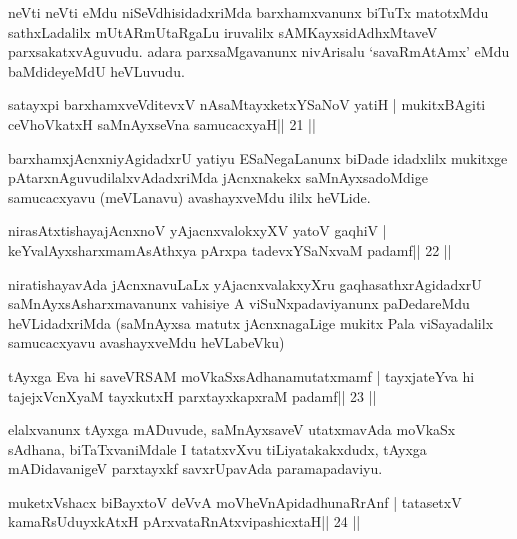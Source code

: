 \begin{artha}
neVti neVti eMdu niSeVdhisidadxriMda barxhamxvanunx biTuTx matotxMdu sathxLadalilx mUtARmUtaRgaLu iruvalilx sAMKayxsidAdhxMtaveV parxsakatxvAguvudu. adara parxsaMgavanunx nivArisalu `savaRmAtAmx' eMdu baMdideyeMdU heVLuvudu.
\end{artha}


\begin{shl}
satayxpi barxhamxveVditevxV nAsaMtayxketxYSaNoV yatiH |
mukitxBAgiti ceVhoVkatxH saMnAyxseVna samucacxyaH\hfill || 21 ||
\end{shl}

\begin{artha}
barxhamxjAcnxniyAgidadxrU yatiyu ESaNegaLanunx biDade idadxlilx mukitxge pAtarxnAguvudilalxvAdadxriMda jAcnxnakekx saMnAyxsadoMdige samucacxyavu (meVLanavu) avashayxveMdu ililx heVLide.
\end{artha}

\begin{shl}
nirasAtxtishayajAcnxnoV yAjacnxvalokxyXV yatoV gaqhiV |
keYvalAyxsharxmamAsAthxya pArxpa tadevxYSaNxvaM padamf\hfill || 22 ||
\end{shl}

\begin{artha}
niratishayavAda jAcnxnavuLaLx yAjacnxvalakxyXru gaqhasathxrAgidadxrU
saMnAyxsAsharxmavanunx vahisiye A viSuNxpadaviyanunx paDedareMdu
heVLidadxriMda (saMnAyxsa matutx jAcnxnagaLige mukitx Pala
viSayadalilx samucacxyavu avashayxveMdu heVLabeVku)
\end{artha}


\begin{shl}
tAyxga Eva hi saveVRSAM moVkaSxsAdhanamutatxmamf |
tayxjateYva hi tajejxVcnXyaM tayxkutxH parxtayxkapxraM padamf\hfill || 23 ||
\end{shl}

\begin{artha}
elalxvanunx tAyxga mADuvude, saMnAyxsaveV utatxmavAda moVkaSx sAdhana, biTaTxvaniMdale I tatatxvXvu tiLiyatakakxdudx, tAyxga mADidavanigeV parxtayxkf savxrUpavAda paramapadaviyu.
\end{artha}


\begin{shl}
muketxVshacx biBayxtoV deVvA moVheVnApidadhunaRrAnf |
tatasetxV kamaRsUduyxkAtxH pArxvataRnAtxvipashicxtaH\hfill || 24 ||
\end{shl}

